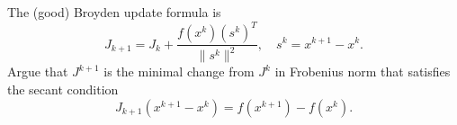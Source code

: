 \documentclass[12pt, leqno]{article}
\begin{document}

The (good) Broyden update formula is
\[
  J_{k+1} = J_k + \frac{f(x^k) (s^k)^T}{\|s^k\|^2}, \quad s^k = x^{k+1}-x^k.
\]
Argue that $J^{k+1}$ is the minimal change from $J^k$ in Frobenius norm that
satisfies the secant condition
\[
  J_{k+1} (x^{k+1}-x^k) = f(x^{k+1})-f(x^k).
\]
\end{document}
